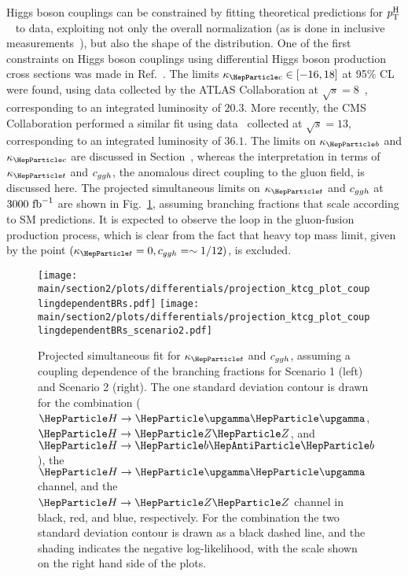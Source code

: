 
Higgs boson couplings can be constrained by fitting theoretical predictions for $p_\text{T}^\text{H}$~\cite{Bishara:2016jga,Grazzini:2017szg,Grazzini:2016paz} to data, exploiting not only the overall normalization (as is done in inclusive measurements~\cite{%
Khachatryan:2016vau,%
Aad:2015zhl,%
CMS:2018lkl%
}), but also the shape of the distribution.
% 
One of the first constraints on Higgs boson couplings using differential Higgs boson production cross sections was made in Ref.~\cite{Bishara:2016jga}.
% 
The limits $\kappac \in [ -16, 18 ]$ at 95\% CL were found, using data collected by the ATLAS Collaboration at $\sqrt{s}=8$\UTeV~\cite{Aad:2015lha}, corresponding to an integrated luminosity of $20.3$\Uifb.
% 
More recently, the CMS Collaboration performed a similar fit using data~\cite{CMS-PAS-HIG-17-028} collected at $\sqrt{s}=13$\UTeV, corresponding to an integrated luminosity of $36.1$\Uifb.
% 
The limits on $\kappab$ and $\kappac$ are discussed in Section~, whereas the interpretation in terms of $\kappat$ and $c_{ggh}$, the anomalous direct coupling to the gluon field, is discussed here.
% 
The projected simultaneous limits on $\kappat$ and $c_{ggh}$ at $3000~\text{fb}^{-1}$ are shown in Fig.~\ref{fig:ktcg_couplingdependentBRs}, assuming branching fractions that scale according to SM predictions.
% 
It is expected to observe the loop in the gluon-fusion production process, which is clear from the fact that heavy top mass limit, given by the point $(\kappat =0, \cg=\sim 1/12)$, is excluded.

\begin{figure}[hbtp]
  \begin{center}
    \texttt{[image: \\main/section2/plots/differentials/projection\_ktcg\_plot\_couplingdependentBRs.pdf]}
    \texttt{[image: \\main/section2/plots/differentials/projection\_ktcg\_plot\_couplingdependentBRs\_scenario2.pdf]}
    \caption{
        Projected simultaneous fit for $\kappat$ and $c_{ggh}$, assuming a coupling dependence of the branching fractions for Scenario 1 (left) and Scenario 2 (right).
        The one standard deviation contour is drawn for the combination ($\hgg$, $\hzz$, and $\hbb$), the $\hgg$ channel, and the $\hzz$ channel in black, red, and blue, respectively.
        For the combination the two standard deviation contour is drawn as a black dashed line, and the shading indicates the negative log-likelihood, with the scale shown on the right hand side of the plots.
        }
    \label{fig:ktcg_couplingdependentBRs}
  \end{center}
\end{figure}

